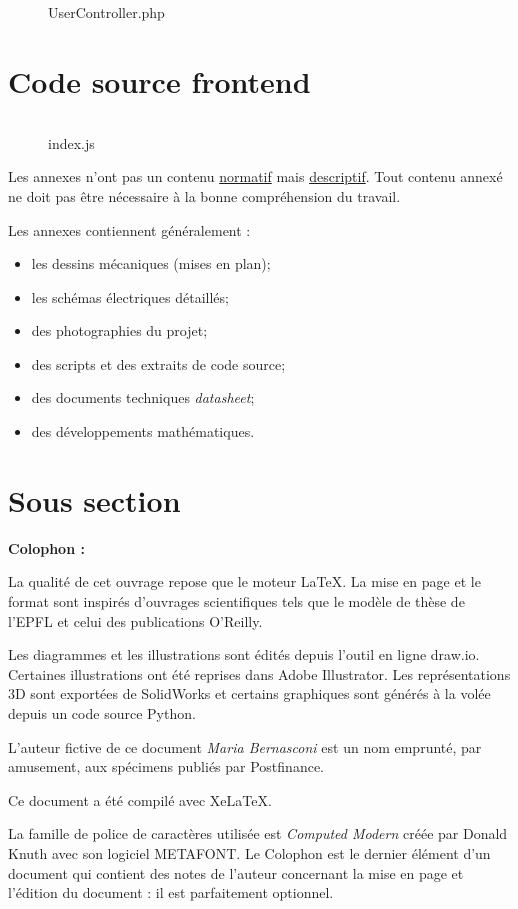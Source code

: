 \documentclass[
    iai, %
    eai, %
]{heig-tb}
\begin{document}
\begin{figure}[h]
  \inputminted[breaklines]{javascript}{assets/code/UserController.php}
  \caption{UserController.php}
\end{figure}

\section{Code source frontend}

\begin{figure}[h]
  \inputminted[breaklines]{javascript}{assets/code/index.js}
  \caption{index.js}
\end{figure}

Les annexes n'ont pas un contenu \underline{normatif} mais \underline{descriptif}. Tout contenu annexé ne doit pas être nécessaire à la bonne compréhension du travail.

Les annexes contiennent généralement :

\begin{itemize}
  \item les dessins mécaniques (mises en plan);
  \item les schémas électriques détaillés;
  \item des photographies du projet;
  \item des scripts et des extraits de code source;
  \item des documents techniques \pex \emph{datasheet};
  \item des développements mathématiques.
\end{itemize}
\section{Sous section}
\lipsum[1]

\let\cleardoublepage\clearpage
\backmatter

\label{glossaire}
\printnoidxglossary
\printbibliography
\label{index}
\printindex

\clearpage
\Large\textbf{Colophon :}\par\normalsize
\thispagestyle{empty}
La qualité de cet ouvrage repose que le moteur \LaTeX. La mise en page et le format sont inspirés d'ouvrages scientifiques tels que le modèle de thèse de l'EPFL et celui des publications O'Reilly.

Les diagrammes et les illustrations sont édités depuis l'outil en ligne draw.io. Certaines illustrations ont été reprises dans Adobe Illustrator. Les représentations 3D sont exportées de SolidWorks et certains graphiques sont générés à la volée depuis un code source Python.

L'auteur fictive de ce document \emph{Maria Bernasconi} est un nom emprunté, par amusement, aux spécimens publiés par Postfinance.

Ce document a été compilé avec XeLaTeX.

La famille de police de caractères utilisée est \emph{Computed Modern} créée par Donald Knuth avec son logiciel METAFONT.
\vfil
Le Colophon est le dernier élément d'un document qui contient des notes de l'auteur concernant la mise en page et l'édition du document : il est parfaitement optionnel.
\end{document}
